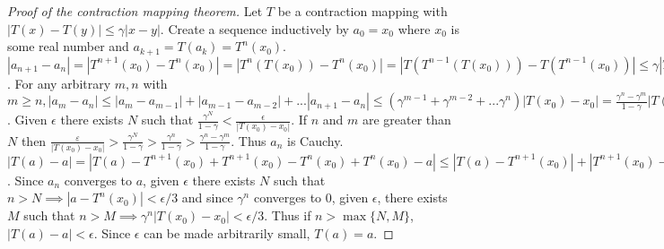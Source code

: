 \documentclass{article}
\newcommand{\eps}{\varepsilon}
\begin{document}
\begin{proof}[Proof of the contraction mapping theorem]
Let $T$ be a contraction mapping with $|T(x)-T(y)|\leq\gamma|x-y|$. Create a sequence inductively by $a_0=x_0$ where $x_0$ is some real number and $a_{k+1}=T(a_k)=T^n(x_0)$. $|a_{n+1}-a_n|=|T^{n+1}(x_0)-T^n(x_0)|=|T^n(T(x_0))-T^n(x_0)|=|T(T^{n-1}(T(x_0)))-T(T^{n-1}(x_0))|\leq\gamma|T^{n-1}(T(x_0))-T^{n-1}(x_0)|\leq\gamma^n|T(x_0)-x_0|$. For any arbitrary $m,n$ with $m\geq n, |a_m-a_n|\leq|a_m-a_{m-1}|+|a_{m-1}-a_{m-2}|+...|a_{n+1}-a_n|\leq(\gamma^{m-1}+\gamma^{m-2}+...\gamma^{n})|T(x_0)-x_0|=\frac{\gamma^n-\gamma^m}{1-\gamma}|T(x_0)-x_0|$. Given $\epsilon$ there exists $N$ such that $\frac{\gamma^{N}}{1-\gamma}<\frac{\epsilon}{|T(x_0)-x_0|}$. If $n$ and $m$ are greater than $N$ then $\frac{\eps}{|T(x_0)-x_0|}>\frac{\gamma^{N}}{1-\gamma}>\frac{\gamma^n}{1-\gamma}>\frac{\gamma^n-\gamma^m}{1-\gamma}$. Thus $a_n$ is Cauchy. $|T(a)-a|=|T(a)-T^{n+1}(x_0)+T^{n+1}(x_0)-T^n(x_0)+T^n(x_0)-a|\leq|T(a)-T^{n+1}(x_0)|+|T^{n+1}(x_0)-T^n(x_0)|+|T^n(x_0)-a|<2|a-T^n(x_0)|+|T^{n+1}(x_0)-T^n(x_0)|\leq 2|a-T^n(x_0)|+\gamma^n|T(x_0)-x_0|$. Since $a_n$ converges to $a$, given $\epsilon$ there exists $N$ such that $n>N\implies |a-T^n(x_0)|<\epsilon/3$ and since $\gamma^n$ converges to 0, given $\epsilon$, there exists $M$ such that $n>M\implies \gamma^n|T(x_0)-x_0|<\epsilon/3$. Thus if $n>\max\{N,M\}$, $|T(a)-a|<\epsilon$. Since $\epsilon$ can be made arbitrarily small, $T(a)=a$.
\end{proof}
\end{document}
